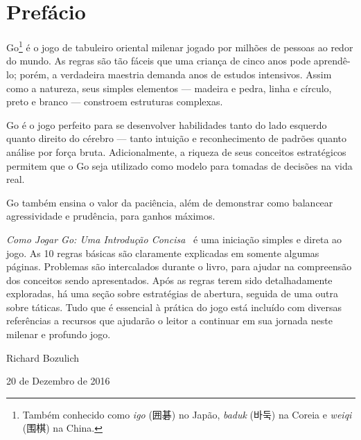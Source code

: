 \chapter{Prefácio}

Go\footnote{Também conhecido como \emph{igo} (囲碁) no Japão, \emph{baduk} (바둑) na Coreia e \emph{weiqi} (围棋) na China.} é o jogo de tabuleiro oriental milenar jogado por milhões de pessoas ao redor do mundo. As regras são tão fáceis que uma criança de cinco anos pode aprendê-lo; porém, a verdadeira maestria demanda anos de estudos intensivos. Assim como a natureza, seus simples elementos --- madeira e pedra, linha e círculo, preto e branco --- constroem estruturas complexas.

Go é o jogo perfeito para se desenvolver habilidades tanto do lado esquerdo quanto direito do cérebro --- tanto intuição e reconhecimento de padrões quanto análise por força bruta. Adicionalmente, a riqueza de seus conceitos estratégicos permitem que o Go seja utilizado como modelo para tomadas de decisões na vida real.

Go também ensina o valor da paciência, além de demonstrar como balancear agressividade e prudência, para ganhos máximos.

\bigskip

\emph{Como Jogar Go: Uma Introdução Concisa}~\cite{bozulich_how_to_play_go} é uma iniciação simples e direta ao jogo. As 10 regras básicas são claramente explicadas em somente algumas páginas. Problemas são intercalados durante o livro, para ajudar na compreensão dos conceitos sendo apresentados. Após as regras terem sido detalhadamente exploradas, há uma seção sobre estratégias de abertura, seguida de uma outra sobre táticas. Tudo que é essencial à prática do jogo está incluído com diversas referências a recursos que ajudarão o leitor a continuar em sua jornada neste milenar e profundo jogo.

\bigskip
\bigskip

Richard Bozulich

20 de Dezembro de 2016